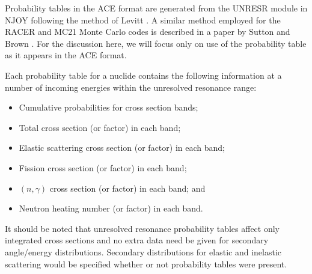 Probability tables in the ACE format are generated from the UNRESR module in
NJOY \cite{lanl-macfarlane-1994} following the method of Levitt
\cite{nse-levitt-1972}. A similar method employed for the RACER and MC21 Monte
Carlo codes is described in a paper by Sutton and Brown
\cite{physor-sutton-1998}. For the discussion here, we will focus only on use of
the probability table as it appears in the ACE format.

Each probability table for a nuclide contains the following information at a
number of incoming energies within the unresolved resonance range:
\begin{itemize}
\item Cumulative probabilities for cross section bands;
\item Total cross section (or factor) in each band;
\item Elastic scattering cross section (or factor) in each band;
\item Fission cross section (or factor) in each band;
\item $(n,\gamma)$ cross section (or factor) in each band; and
\item Neutron heating number (or factor) in each band.
\end{itemize}
It should be noted that unresolved resonance probability tables affect only
integrated cross sections and no extra data need be given for secondary
angle/energy distributions. Secondary distributions for elastic and inelastic
scattering would be specified whether or not probability tables were present.

